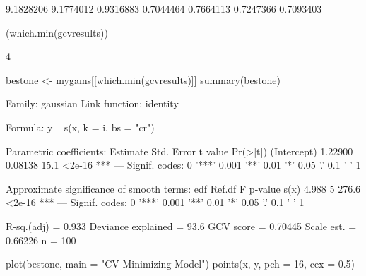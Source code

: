 \begin{Schunk}
\begin{Soutput}
[1] 9.1828206 9.1774012 0.9316883 0.7044464 0.7664113 0.7247366 0.7093403
\end{Soutput}
\begin{Sinput}
 (which.min(gcvresults))
\end{Sinput}
\begin{Soutput}
[1] 4
\end{Soutput}
\begin{Sinput}
 bestone <- mygams[[which.min(gcvresults)]]
 summary(bestone)
\end{Sinput}
\begin{Soutput}
Family: gaussian 
Link function: identity 

Formula:
y ~ s(x, k = i, bs = "cr")

Parametric coefficients:
            Estimate Std. Error t value Pr(>|t|)    
(Intercept)  1.22900    0.08138    15.1   <2e-16 ***
---
Signif. codes:  0 '***' 0.001 '**' 0.01 '*' 0.05 '.' 0.1 ' ' 1 

Approximate significance of smooth terms:
       edf Ref.df     F p-value    
s(x) 4.988      5 276.6  <2e-16 ***
---
Signif. codes:  0 '***' 0.001 '**' 0.01 '*' 0.05 '.' 0.1 ' ' 1 

R-sq.(adj) =  0.933   Deviance explained = 93.6%
GCV score = 0.70445  Scale est. = 0.66226   n = 100
\end{Soutput}
\begin{Sinput}
 plot(bestone, main = "CV Minimizing Model")
 points(x, y, pch = 16, cex = 0.5)
\end{Sinput}
\end{Schunk}
